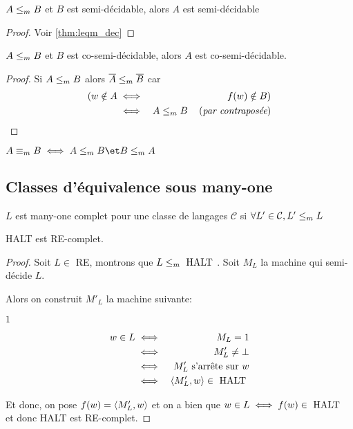 \begin{theorem}
	$A \leq_m B$ et $B$ est semi-décidable, alors $A$ est semi-décidable
\end{theorem}

\begin{proof}
	Voir \ref{thm:leqm_dec}
\end{proof}

\begin{theorem}
	$A \leq_m B$ et $B$ est co-semi-décidable, alors $A$ est co-semi-décidable.
\end{theorem}

\begin{proof}
	Si $A \leq_m B$ alors $\overline A \leq_m \overline B$ car
	\begin{eqnarray*}
		(w \notin A &\iff& f(w) \notin B) \\
		&\iff& A \leq_m B \quad\left(\textit{par contraposée}\right)
	\end{eqnarray*}
\end{proof}

\begin{definition}
	$A \equivm B \iff A \leqm B \et B \leqm A$
\end{definition}

\subsection{Classes d'équivalence sous many-one}

\begin{definition}
	$L$ est many-one complet pour une classe de langages $\mathcal C$ si $\forall L' \in \mathcal C, L' \leq_m L$
\end{definition}

\begin{prop}
	HALT est RE-complet.
\end{prop}

\begin{proof}
	Soit $L \in $ RE, montrons que $L \leq_m \text{ HALT }$. Soit $M_L$ la machine qui semi-décide $L$.

	Alors on construit $M'_L$ la machine suivante:
	\begin{algorithmic}[lines]
		 {$1$}
		\Else { $\bot$}
		\EndIf
		\EndFunction
	\end{algorithmic}

	\begin{eqnarray*}
		w \in L &\iff& M_L = 1 \\
		&\iff& M'_L \neq \bot \\
		&\iff& M'_L \text{ s'arrête sur } w\\
		&\iff& \left\langle M'_L,w\right\rangle \in \text{ HALT }
	\end{eqnarray*}

	Et donc, on pose $f (w) = \left\langle M'_L,w\right\rangle$ et on a bien que
	$w \in L \iff f(w) \in \text{ HALT }$ et donc HALT est RE-complet.
\end{proof}

